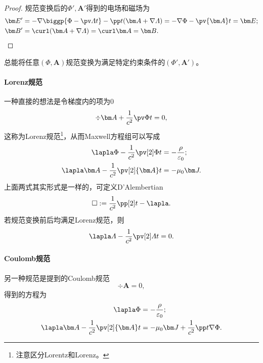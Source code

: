 \begin{proof}
    规范变换后的$\Phi',\bm A'$得到的电场和磁场为
    \begin{align*}
        \bm E'&=-\nabla\biggp{\Phi-\pv\varLambda t}-\pp t(\bm A+\nabla\varLambda)=-\nabla\Phi-\pv{\bm A}t=\bm E;\\
        \bm B'&=\curl(\bm A+\nabla\varLambda)=\curl\bm A=\bm B.
        \qedhere
    \end{align*}
\end{proof}

\begin{corollary}
    总能将任意$(\Phi,\bm A)$规范变换为满足特定约束条件的$(\Phi',\bm A')$。
\end{corollary}

\paragraph{Lorenz规范}

一种直接的想法是令梯度内的项为0
\begin{equation}
    \div\bm A+\frac1{c^2}\pv\Phi t=0,
\end{equation}
这称为Lorenz规范\footnote{注意区分Lorentz和Lorenz。}，从而Maxwell方程组可以写成
\begin{subequations}
    \begin{align}
        \lapla\Phi-\frac1{c^2}\pv[2]\Phi t&=-\frac\rho{\varepsilon_0};\\
        \lapla\bm A-\frac1{c^2}\pv[2]{\bm A}t&=-\mu_0\bm J.
    \end{align}
\end{subequations}
上面两式其实形式是一样的，可定义D'Alembertian%
\begin{equation}
    \square:=\frac1{c^2}\pp[2]t-\lapla.
\end{equation}
若规范变换前后均满足Lorenz规范，则
\begin{equation}
    \lapla\varLambda-\frac1{c^2}\pv[2]\varLambda t=0.
\end{equation}
\paragraph{Coulomb规范}
另一种规范是提到的Coulomb规范
\[
    \div\bm A=0,
\]
得到的方程为
\begin{subequations}
    \begin{align}
        \label{eqn:Coulomb gauge Phi}
        \lapla\Phi&=-\frac\rho{\varepsilon_0};\\
        \label{eqn:Coulomb gauge A}
        \lapla\bm A-\frac1{c^2}\pv[2]{\bm A}t&=-\mu_0\bm J+\frac1{c^2}\pp t\nabla\Phi.
    \end{align}
\end{subequations}


